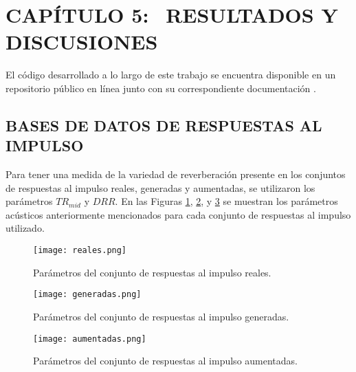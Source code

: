 \section[Resultados y Discusiones]{CAPÍTULO 5:$\ \ \ \ $RESULTADOS Y DISCUSIONES} 
El código desarrollado a lo largo de este trabajo se encuentra disponible en un repositorio público en línea junto con su correspondiente documentación \cite{repo}.

\subsection[Bases de datos de respuestas al impulso]{BASES DE DATOS DE RESPUESTAS AL IMPULSO}

Para tener una medida de la variedad de reverberación presente en los conjuntos de respuestas al impulso reales, generadas y aumentadas, se utilizaron los parámetros $TR_{mid}$ y $DRR$. En las Figuras \ref{fig:cloud_reales}, \ref{fig:cloud_generadas}, y \ref{fig:cloud_aumentadas} se muestran los parámetros acústicos anteriormente mencionados para cada conjunto de respuestas al impulso utilizado.  

\begin{figure}[H]
	\centering{}
	\texttt{[image: reales.png]}
	\caption{Parámetros del conjunto de respuestas al impulso reales.}
	\label{fig:cloud_reales}
\end{figure}

\begin{figure}[H]
	\centering{}
	\texttt{[image: generadas.png]}
	\caption{Parámetros del conjunto de respuestas al impulso generadas.}
	\label{fig:cloud_generadas}
\end{figure}

\begin{figure}[H]
	\centering{}
	\texttt{[image: aumentadas.png]}
	\caption{Parámetros del conjunto de respuestas al impulso aumentadas.}
	\label{fig:cloud_aumentadas}
\end{figure}

